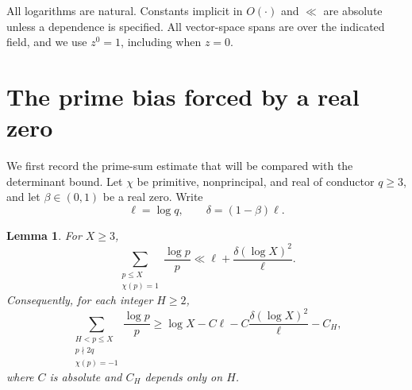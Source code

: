 \documentclass[11pt,a4paper]{amsart}
\newtheorem{lemma}[theorem]{Lemma}
\theoremstyle{remark}
\numberwithin{equation}{section}
\begin{document}
All logarithms are natural. Constants
implicit in $O(\cdot)$ and $\ll$ are absolute unless a dependence is
specified. All vector-space spans are over the indicated field, and
we use $z^0=1$, including when $z=0$.

\section{The prime bias forced by a real zero}\label{sec:analytic}

We first record the prime-sum estimate that will be compared with the
determinant bound. Let $\chi$ be primitive, nonprincipal, and real of
conductor $q\ge3$, and let $\beta\in(0,1)$ be a real zero. Write
\[
 \ell=\log q,\qquad \delta=(1-\beta)\ell.
\]

\begin{lemma}\label{lem:primebias}
For $X\ge3$,
\begin{equation}\label{eq:primebias}
 \sum_{\substack{p\le X\\\chi(p)=1}}\frac{\log p}{p}
 \ll \ell+\frac{\delta(\log X)^2}{\ell}.
\end{equation}
Consequently, for each integer $H\ge2$,
\begin{equation}\label{eq:mass}
 \sum_{\substack{H<p\le X\\p\nmid2q\\\chi(p)=-1}}
     \frac{\log p}{p}
 \ge \log X-C\ell-C\frac{\delta(\log X)^2}{\ell}-C_H,
\end{equation}
where $C$ is absolute and $C_H$ depends only on $H$.
\end{lemma}
\end{document}
